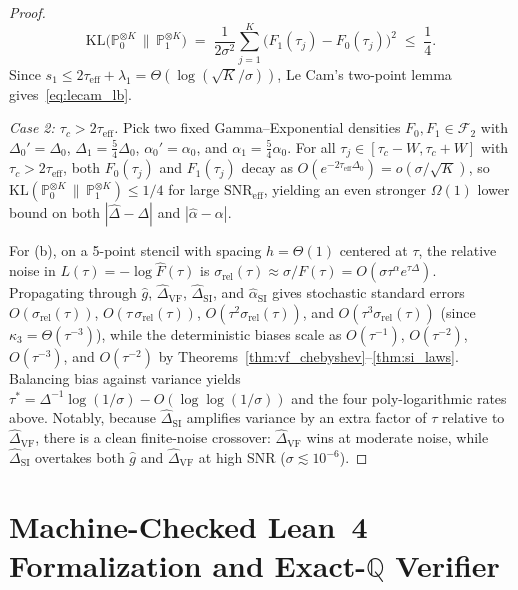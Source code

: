 \documentclass[11pt,a4paper]{article}
\theoremstyle{definition}
\newcommand{\Q}{\mathbb{Q}}
\begin{document}
\begin{proof}
\[
  \mathrm{KL}\bigl(\mathbb{P}_0^{\otimes K} \,\|\, \mathbb{P}_1^{\otimes K}\bigr)
  \;=\; \frac{1}{2\sigma^2}\sum_{j=1}^K \bigl(F_1(\tau_j) - F_0(\tau_j)\bigr)^2 \;\le\; \frac{1}{4}.
\]
Since $s_1 \le 2\tau_{\mathrm{eff}} + \lambda_1 = \Theta(\log(\sqrt{K}/\sigma))$, Le Cam's two-point lemma~\cite{LeCam1973Convergence,Tsybakov2009Introduction} gives~\eqref{eq:lecam_lb}.

\emph{Case 2: $\tau_c > 2\tau_{\mathrm{eff}}$.} Pick two fixed Gamma--Exponential densities $F_0, F_1 \in \mathcal{F}_2$ with $\Delta_0' = \Delta_0$, $\Delta_1 = \frac{5}{4}\Delta_0$, $\alpha_0' = \alpha_0$, and $\alpha_1 = \frac{5}{4}\alpha_0$. For all $\tau_j \in [\tau_c - W, \tau_c + W]$ with $\tau_c > 2\tau_{\mathrm{eff}}$, both $F_0(\tau_j)$ and $F_1(\tau_j)$ decay as $O(e^{-2\tau_{\mathrm{eff}}\Delta_0}) = o(\sigma / \sqrt{K})$, so $\mathrm{KL}(\mathbb{P}_0^{\otimes K} \,\|\, \mathbb{P}_1^{\otimes K}) \le 1/4$ for large $\mathrm{SNR}_{\mathrm{eff}}$, yielding an even stronger $\Omega(1)$ lower bound on both $|\widehat{\Delta}-\Delta|$ and $|\widehat{\alpha}-\alpha|$.

For (b), on a 5-point stencil with spacing $h = \Theta(1)$ centered at $\tau$, the relative noise in $L(\tau) = -\log \hat{F}(\tau)$ is $\sigma_{\mathrm{rel}}(\tau) \approx \sigma / F(\tau) = O(\sigma \tau^\alpha e^{\tau\Delta})$. Propagating through $\widehat{g}$, $\widehat{\Delta}_{\mathrm{VF}}$, $\widehat{\Delta}_{\mathrm{SI}}$, and $\widehat{\alpha}_{\mathrm{SI}}$ gives stochastic standard errors $O(\sigma_{\mathrm{rel}}(\tau))$, $O(\tau\,\sigma_{\mathrm{rel}}(\tau))$, $O(\tau^2 \sigma_{\mathrm{rel}}(\tau))$, and $O(\tau^3 \sigma_{\mathrm{rel}}(\tau))$ (since $\kappa_3 = \Theta(\tau^{-3})$), while the deterministic biases scale as $O(\tau^{-1})$, $O(\tau^{-2})$, $O(\tau^{-3})$, and $O(\tau^{-2})$ by Theorems~\ref{thm:vf_chebyshev}--\ref{thm:si_laws}. Balancing bias against variance yields $\tau^* = \Delta^{-1}\log(1/\sigma) - O(\log\log(1/\sigma))$ and the four poly-logarithmic rates above. Notably, because $\widehat{\Delta}_{\mathrm{SI}}$ amplifies variance by an extra factor of $\tau$ relative to $\widehat{\Delta}_{\mathrm{VF}}$, there is a clean finite-noise crossover: $\widehat{\Delta}_{\mathrm{VF}}$ wins at moderate noise, while $\widehat{\Delta}_{\mathrm{SI}}$ overtakes both $\widehat{g}$ and $\widehat{\Delta}_{\mathrm{VF}}$ at high SNR ($\sigma \lesssim 10^{-6}$).
\end{proof}

\section{Machine-Checked Lean~4 Formalization and Exact-\texorpdfstring{$\Q$}{Q} Verifier}
\label{sec:formalization}
\end{document}
